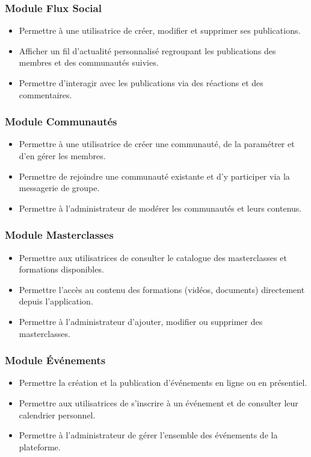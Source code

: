 \documentclass[12pt,a4paper]{report}
\begin{document}
	\subsubsection*{Module Flux Social}
	\begin{itemize}
		\item Permettre à une utilisatrice de créer, modifier et supprimer 
		ses publications.
		\item Afficher un fil d'actualité personnalisé regroupant les publications 
		des membres et des communautés suivies.
		\item Permettre d'interagir avec les publications via des réactions 
		et des commentaires.
	\end{itemize}
	
	\subsubsection*{Module Communautés}
	\begin{itemize}
		\item Permettre à une utilisatrice de créer une communauté, de la 
		paramétrer et d'en gérer les membres.
		\item Permettre de rejoindre une communauté existante et d'y participer 
		via la messagerie de groupe.
		\item Permettre à l'administrateur de modérer les communautés et 
		leurs contenus.
	\end{itemize}
	
	\subsubsection*{Module Masterclasses}
	\begin{itemize}
		\item Permettre aux utilisatrices de consulter le catalogue des 
		masterclasses et formations disponibles.
		\item Permettre l'accès au contenu des formations (vidéos, documents) 
		directement depuis l'application.
		\item Permettre à l'administrateur d'ajouter, modifier ou supprimer 
		des masterclasses.
	\end{itemize}
	
	\subsubsection*{Module Événements}
	\begin{itemize}
		\item Permettre la création et la publication d'événements en ligne 
		ou en présentiel.
		\item Permettre aux utilisatrices de s'inscrire à un événement et 
		de consulter leur calendrier personnel.
		\item Permettre à l'administrateur de gérer l'ensemble des événements 
		de la plateforme.
	\end{itemize}
	
\end{document}

